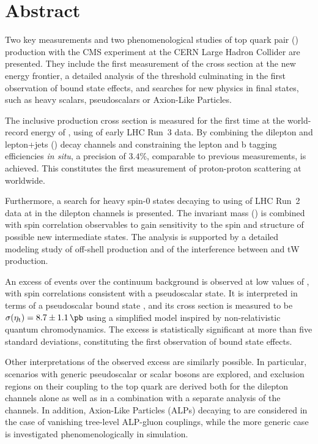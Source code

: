 \cleardoublepage %
\chapter*{Abstract}

Two key measurements and two phenomenological studies of top quark pair (\ttbar) production with the CMS experiment at the CERN Large Hadron Collider are presented. They include the first measurement of the \ttbar cross section at the new energy frontier, a detailed analysis of the \ttbar threshold culminating in the first observation of \ttbar bound state effects, and searches for new physics in \ttbar final states, such as heavy scalars, pseudoscalars or Axion-Like Particles.

The inclusive \ttbar production cross section \sigmatt is measured for the first time at the world-record energy of \sqrtsRIII, using \lumiRIII of early LHC Run~3 data. By combining the dilepton and lepton+jets (\ljets) decay channels and constraining the lepton and b tagging efficiencies \textit{in situ}, a precision of $3.4\%$, comparable to previous \sigmatt measurements, is achieved. This constitutes the first measurement of proton-proton scattering at \sqrtsRIII worldwide.

Furthermore, a search for heavy spin-0 states decaying to \ttbar using \lumiRII of LHC Run~2 data at \sqrtsRII in the dilepton channels is presented. The invariant \ttbar mass (\mtt) is combined with spin correlation observables to gain sensitivity to the spin and \CP structure of possible new intermediate states. 
The analysis is supported by a detailed modeling study of off-shell \ttbar production and of the interference between \ttbar and tW production.

An excess of events over the \ttbar continuum background is observed at low values of \mtt, with spin correlations consistent with a pseudoscalar state. It is interpreted in terms of a pseudoscalar \ttbar bound state \etat, and its cross section is measured to be $\sigetat =  8.7 \pm 1.1  \, \si{\pb}$ using a simplified model inspired by non-relativistic quantum chromodynamics. 
The excess is statistically significant at more than five standard deviations, constituting the first observation of \ttbar bound state effects.

Other interpretations of the observed excess are similarly possible. In particular, scenarios with generic pseudoscalar or scalar bosons are explored, and exclusion regions on their coupling to the top quark are derived both for the dilepton channels alone as well as in a combination with a separate analysis of the \ljets channels. In addition, Axion-Like Particles (ALPs) decaying to \ttbar are considered in the case of vanishing tree-level ALP-gluon couplings, while the more generic case is investigated phenomenologically in simulation.

